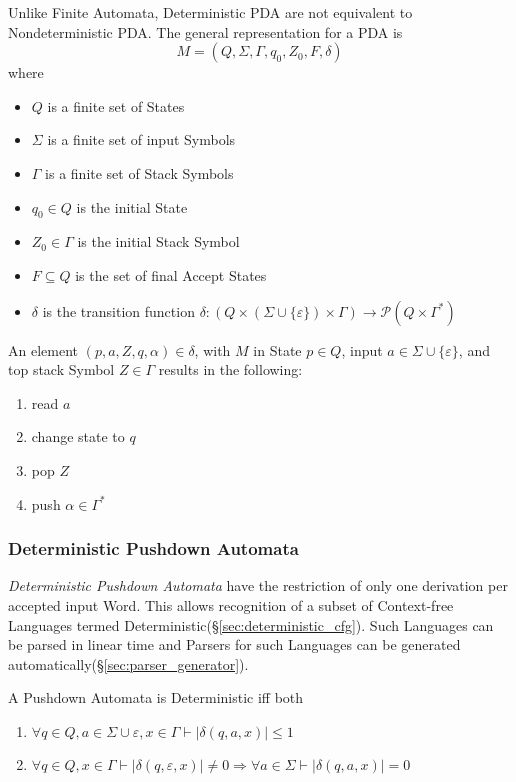 Unlike Finite Automata, Deterministic PDA are not equivalent to
Nondeterministic PDA. The general representation for a PDA is
\[
    M = (Q, \Sigma, \Gamma, q_0, Z_0, F, \delta)
\]
where
\begin{itemize}
\item $Q$ is a finite set of States
\item $\Sigma$ is a finite set of input Symbols
\item $\Gamma$ is a finite set of Stack Symbols
\item $q_0 \in Q$ is the initial State
\item $Z_0 \in \Gamma$ is the initial Stack Symbol
\item $F \subseteq Q$ is the set of final Accept States
\item $\delta$ is the transition function $\delta: (Q \times (\Sigma
  \cup \{\varepsilon\}) \times \Gamma) \rightarrow \mathcal{P}(Q \times
  \Gamma^*)$
\end{itemize}

An element $(p,a,Z,q,\alpha)\in\delta$, with $M$ in State $p \in Q$,
input $a \in \Sigma \cup \{\varepsilon\}$, and top stack Symbol $Z \in
\Gamma$ results in the following:
\begin{enumerate}
\item read $a$
\item change state to $q$
\item pop $Z$
\item push $\alpha \in \Gamma^*$
\end{enumerate}



\subsubsection{Deterministic Pushdown Automata}\label{sec:deterministic_pda}

\emph{Deterministic Pushdown Automata} have the restriction of only
one derivation per accepted input Word. This allows recognition of a
subset of Context-free Languages termed
Deterministic(\S\ref{sec:deterministic_cfg}). Such Languages can be
parsed in linear time and Parsers for such Languages can be generated
automatically(\S\ref{sec:parser_generator}).

A Pushdown Automata is Deterministic iff both
\begin{enumerate}
\item $\forall q \in Q, a \in \Sigma \cup {\varepsilon}, x \in
  \Gamma \vdash |\delta(q,a,x)| \leq 1$
\item $\forall q \in Q, x \in \Gamma \vdash |\delta(q,\varepsilon,x)|
  \neq 0 \Rightarrow \forall a \in \Sigma \vdash |\delta(q,a,x)|=0$
\end{enumerate}



